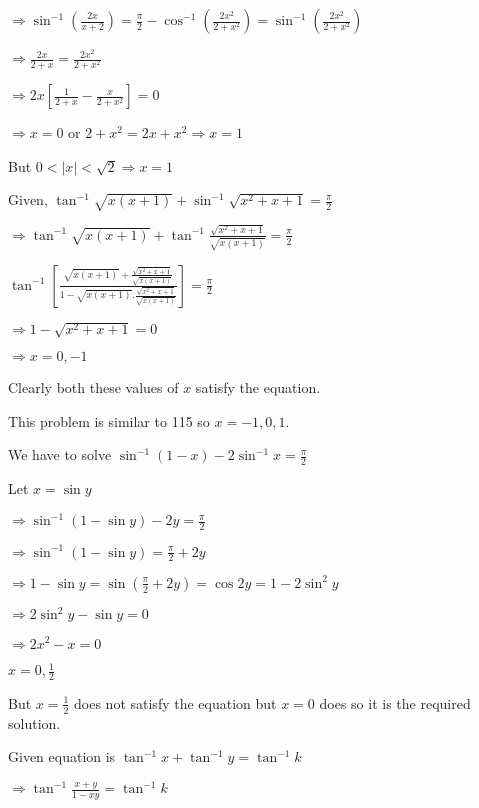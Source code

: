   $\Rightarrow \sin^{-1}\left(\frac{2x}{x + 2}\right) = \frac{\pi}{2} - \cos^{-1}\left(\frac{2x^2}{2 + x^2}\right) =
  \sin^{-1}\left(\frac{2x^2}{2 + x^2}\right)$

  $\Rightarrow \frac{2x}{2 + x} = \frac{2x^2}{2 + x^2}$

  $\Rightarrow 2x\left[\frac{1}{2 + x} - \frac{x}{2 + x^2}\right] = 0$

  $\Rightarrow x = 0$ or $2 + x^2 = 2x + x^2 \Rightarrow x = 1$

  But $0 < |x| < \sqrt{2} \Rightarrow x = 1$

\item Given, $\tan^{-1}\sqrt{x(x + 1)} + \sin^{-1}\sqrt{x^2 + x + 1} = \frac{\pi}{2}$

  $\Rightarrow \tan^{-1}\sqrt{x(x + 1)} + \tan^{-1}\frac{\sqrt{x^2 + x + 1}}{\sqrt{x(x + 1)}} = \frac{\pi}{2}$

  $\tan^{-1}\left[\frac{\sqrt{x(x + 1)} + \frac{\sqrt{x^2 + x + 1}}{\sqrt{x(x + 1)}}}{1 - \sqrt{x(x + 1)}.\frac{\sqrt{x^2 +
        x + 1}}{\sqrt{x(x + 1)}}}\right] = \frac{\pi}{2}$

  $\Rightarrow 1 - \sqrt{x^2 + x + 1} = 0$

  $\Rightarrow x = 0, -1$

  Clearly both these values of $x$ satisfy the equation.

\item This problem is similar to 115 so $x = -1, 0, 1$.

\item We have to solve $\sin^{-1}(1 - x) - 2\sin^{-1}x = \frac{\pi}{2}$

  Let $x = \sin y$

  $\Rightarrow \sin^{-1}(1 - \sin y) - 2y = \frac{\pi}{2}$

  $\Rightarrow \sin^{-1}(1 - \sin y) =\frac{\pi}{2} + 2y$

  $\Rightarrow 1 - \sin y = \sin\left(\frac{\pi}{2} + 2y\right) = \cos2y = 1 - 2\sin^2y$

  $\Rightarrow 2\sin^2y - \sin y = 0$

  $\Rightarrow 2x^2 - x = 0$

  $x = 0, \frac{1}{2}$

  But $x = \frac{1}{2}$ does not satisfy the equation but $x = 0$ does so it is the required solution.

\item Given equation is $\tan^{-1}x + \tan^{-1}y = \tan^{-1}k$

  $\Rightarrow \tan^{-1}\frac{x + y}{1 - xy} = \tan^{-1}k$


